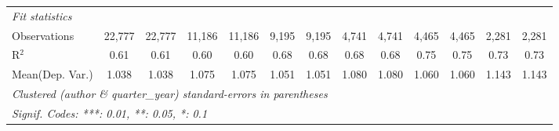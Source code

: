 \begin{tabular}{lcccccccccccc}
   \midrule
   \emph{Fit statistics}\\
   Observations                             & 22,777        & 22,777        & 11,186        & 11,186       & 9,195        & 9,195          & 4,741   & 4,741          & 4,465   & 4,465          & 2,281   & 2,281\\  
   R$^2$                                    & 0.61          & 0.61          & 0.60          & 0.60         & 0.68         & 0.68           & 0.68    & 0.68           & 0.75    & 0.75           & 0.73    & 0.73\\  
Mean(Dep. Var.) & 1.038 & 1.038 & 1.075 & 1.075 & 1.051 & 1.051 & 1.080 & 1.080 & 1.060 & 1.060 & 1.143 & 1.143 \\
   \midrule \midrule
   \multicolumn{13}{l}{\emph{Clustered (author \& quarter\_year) standard-errors in parentheses}}\\
   \multicolumn{13}{l}{\emph{Signif. Codes: ***: 0.01, **: 0.05, *: 0.1}}\\
\end{tabular}
\par\endgroup
